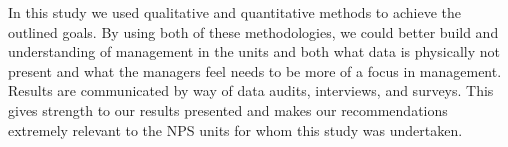 In this study we used qualitative and quantitative methods to achieve the outlined goals.
 By using both of these methodologies, we could
better build and understanding of management in the units and both what data is physically not present and what the managers feel needs to be more of a focus in management. 
Results are communicated by way of data audits, interviews, and surveys. 
This gives strength to our results presented and makes our recommendations extremely relevant to the NPS units for whom this study was undertaken.

